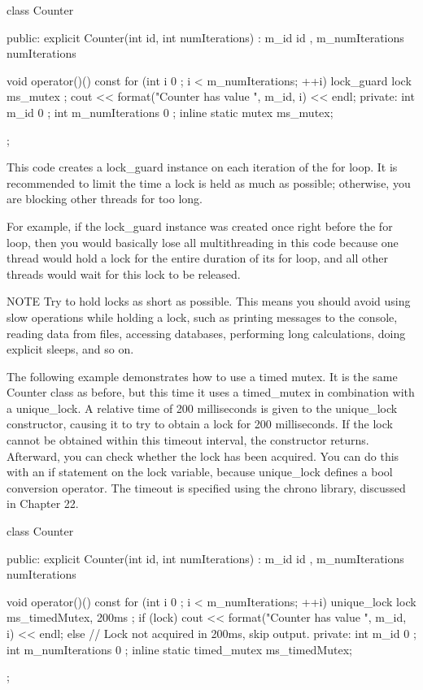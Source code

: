 \begin{cpp}
class Counter
{
    public:
        explicit Counter(int id, int numIterations)
            : m_id { id }, m_numIterations { numIterations } { }

        void operator()() const
        {
            for (int i { 0 }; i < m_numIterations; ++i) {
                lock_guard lock { ms_mutex };
                cout << format("Counter {} has value {}", m_id, i) << endl;
            }
        }
    private:
        int m_id { 0 };
        int m_numIterations { 0 };
        inline static mutex ms_mutex;
};
\end{cpp}

This code creates a lock\_guard instance on each iteration of the for loop. It is recommended to limit the time a lock is held as much as possible; otherwise, you are blocking other threads for too long.

For example, if the lock\_guard instance was created once right before the for loop, then you would basically lose all multithreading in this code because one thread would hold a lock for the entire duration of its for loop, and all other threads would wait for this lock to be released.

\begin{myNotic}{NOTE}
Try to hold locks as short as possible. This means you should avoid using slow operations while holding a lock, such as printing messages to the console, reading data from files, accessing databases, performing long calculations, doing explicit sleeps, and so on.
\end{myNotic}


The following example demonstrates how to use a timed mutex. It is the same Counter class as before, but this time it uses a timed\_mutex in combination with a unique\_lock. A relative time of 200 milliseconds is given to the unique\_lock constructor, causing it to try to obtain a lock for 200 milliseconds. If the lock cannot be obtained within this timeout interval, the constructor returns. Afterward, you can check whether the lock has been acquired. You can do this with an if statement on the lock variable, because unique\_lock defines a bool conversion operator. The timeout is specified using the chrono library, discussed in Chapter 22.

\begin{cpp}
class Counter
{
    public:
        explicit Counter(int id, int numIterations)
            : m_id { id }, m_numIterations { numIterations } { }

        void operator()() const
        {
            for (int i { 0 }; i < m_numIterations; ++i) {
                unique_lock lock { ms_timedMutex, 200ms };
                if (lock) {
                    cout << format("Counter {} has value {}", m_id, i) << endl;
                } else {
                    // Lock not acquired in 200ms, skip output.
                }
            }
        }
    private:
        int m_id { 0 };
        int m_numIterations { 0 };
        inline static timed_mutex ms_timedMutex;
};
\end{cpp}


